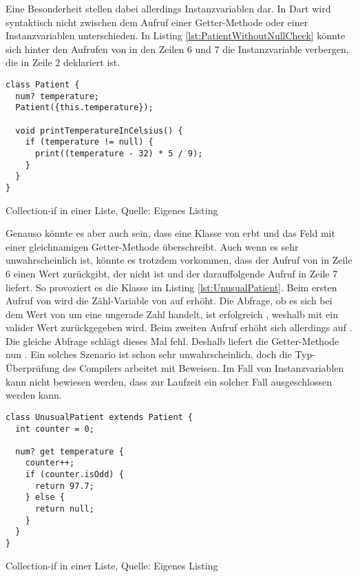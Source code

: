 Eine Besonderheit stellen dabei allerdings Instanzvariablen dar.
In Dart wird syntaktisch nicht zwischen dem Aufruf einer Getter-Methode oder einer Instanzvariablen unterschieden.
In Listing \ref{lst:PatientWithoutNullCheck}
könnte sich hinter den Aufrufen von  in den Zeilen 6 und 7 die Instanzvariable verbergen, die in Zeile 2 deklariert ist.

\ifIncludeFigures
  \begin{listing}[ht]
    \begin{verbatim}
class Patient {
  num? temperature;
  Patient({this.temperature});

  void printTemperatureInCelsius() {
    if (temperature != null) {
      print((temperature - 32) * 5 / 9);
    }
  }
}
    \end{verbatim}
    \caption[Collection-if in einer Liste]{Collection-if in einer Liste, Quelle: Eigenes Listing}
    \label{lst:PatientWithoutNullCheck}
  \end{listing}
\fi

Genauso könnte es aber auch sein, dass eine Klasse von  erbt und das Feld  mit einer gleichnamigen Getter-Methode überschreibt.
Auch wenn es sehr unwahrscheinlich ist, könnte es trotzdem vorkommen, dass der Aufruf von  in Zeile 6 einen Wert zurückgibt, der nicht  ist und der darauffolgende Aufruf in Zeile 7  liefert.
So provoziert es die Klasse  im Listing \ref{lst:UnusualPatient}.
Beim ersten Aufruf von  wird die Zähl-Variable  von  auf  erhöht.
Die Abfrage, ob es sich bei dem Wert von  um eine ungerade Zahl handelt, ist erfolgreich , weshalb mit  ein valider Wert zurückgegeben wird.
Beim zweiten Aufruf erhöht sich  allerdings auf .
Die gleiche Abfrage schlägt dieses Mal fehl.
Deshalb liefert die Getter-Methode nun  .
Ein solches Szenario ist schon sehr unwahrscheinlich, doch die Typ-Überprüfung des Compilers arbeitet mit Beweisen.
Im Fall von Instanzvariablen kann nicht bewiesen werden, dass zur Laufzeit ein solcher Fall ausgeschlossen werden kann.
\ifIncludeFigures
  \begin{listing}[ht]
    \begin{verbatim}
class UnusualPatient extends Patient {
  int counter = 0;

  num? get temperature {
    counter++;
    if (counter.isOdd) {
      return 97.7;
    } else {
      return null;
    }
  }
}
\end{verbatim}
    \caption[Collection-if in einer Liste]{Collection-if in einer Liste, Quelle: Eigenes Listing}
    \label{lst:UnusualPatient}
  \end{listing}
\fi







